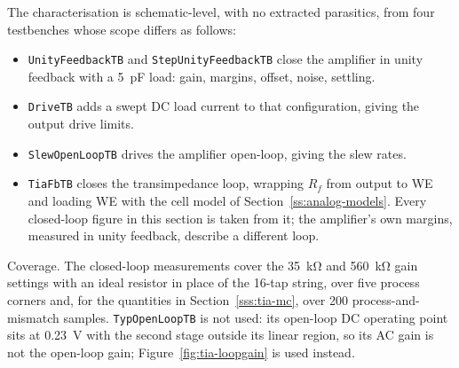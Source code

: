 The characterisation is schematic-level, with no extracted parasitics, from four
testbenches whose scope differs as follows:

\begin{itemize}
\item \texttt{UnityFeedbackTB} and \texttt{StepUnityFeedbackTB} close the amplifier in
unity feedback with a \SI{5}{\pico\farad} load: gain, margins, offset, noise, settling.
\item \texttt{DriveTB} adds a swept DC load current to that configuration, giving the
output drive limits.
\item \texttt{SlewOpenLoopTB} drives the amplifier open-loop, giving the slew rates.
\item \texttt{TiaFbTB} closes the transimpedance loop, wrapping $R_f$ from output to
WE and loading WE with the cell model of Section~\ref{ss:analog-models}. Every
closed-loop figure in this section is taken from it; the amplifier's own margins,
measured in unity feedback, describe a different loop.
\end{itemize}

Coverage. The closed-loop measurements cover the \SI{35}{\kilo\ohm} and
\SI{560}{\kilo\ohm} gain settings with an ideal resistor in place of the 16-tap string,
over five process corners and, for the quantities in Section~\ref{sss:tia-mc}, over 200
process-and-mismatch samples. \texttt{TypOpenLoopTB} is not used: its open-loop DC
operating point sits at \SI{0.23}{\volt} with the second stage outside its linear
region, so its AC gain is not the open-loop gain; Figure~\ref{fig:tia-loopgain} is used
instead.
